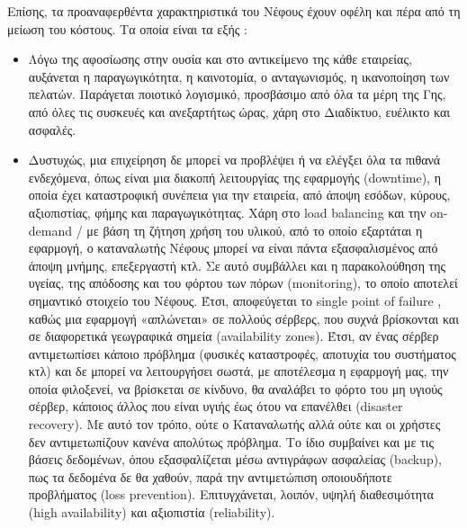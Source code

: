 \documentclass{article}
\begin{document}
Επίσης, τα προαναφερθέντα χαρακτηριστικά του Νέφους έχουν οφέλη και πέρα από τη μείωση του κόστους. Τα οποία είναι τα εξής :
\begin{itemize}
\item	Λόγω της αφοσίωσης στην ουσία και στο αντικείμενο της κάθε εταιρείας, αυξάνεται η παραγωγικότητα, η καινοτομία, ο ανταγωνισμός, η ικανοποίηση των πελατών. Παράγεται ποιοτικό λογισμικό, προσβάσιμο από όλα τα μέρη της Γης, από όλες τις συσκευές και ανεξαρτήτως ώρας, χάρη στο Διαδίκτυο, ευέλικτο και ασφαλές.

\item	Δυστυχώς, μια επιχείρηση δε μπορεί να προβλέψει ή να ελέγξει όλα τα πιθανά ενδεχόμενα, όπως είναι μια διακοπή λειτουργίας της εφαρμογής (downtime), η οποία έχει καταστροφική συνέπεια για την εταιρεία, από άποψη εσόδων, κύρους, αξιοπιστίας, φήμης και παραγωγικότητας. Χάρη στο load balancing και την on-demand / με βάση τη ζήτηση χρήση του υλικού, από το οποίο εξαρτάται η εφαρμογή, ο καταναλωτής Νέφους μπορεί να είναι πάντα εξασφαλισμένος από άποψη μνήμης, επεξεργαστή κτλ. Σε αυτό συμβάλλει και η παρακολούθηση της υγείας, της απόδοσης και του φόρτου των πόρων (monitoring), το οποίο αποτελεί σημαντικό στοιχείο του Νέφους. Έτσι, αποφεύγεται το single point of failure , καθώς μια εφαρμογή «απλώνεται» σε πολλούς σέρβερς, που συχνά βρίσκονται και σε διαφορετικά γεωγραφικά σημεία (availability zones). Έτσι, αν ένας σέρβερ αντιμετωπίσει κάποιο πρόβλημα (φυσικές καταστροφές, αποτυχία του συστήματος κτλ) και δε μπορεί να λειτουργήσει σωστά, με αποτέλεσμα η εφαρμογή μας, την οποία φιλοξενεί, να βρίσκεται σε κίνδυνο, θα αναλάβει το φόρτο του μη υγιούς σέρβερ, κάποιος άλλος που είναι υγιής έως ότου να επανέλθει (disaster recovery). Με αυτό τον τρόπο, ούτε ο Καταναλωτής αλλά ούτε και οι χρήστες δεν αντιμετωπίζουν κανένα απολύτως πρόβλημα. Το ίδιο συμβαίνει και με τις βάσεις δεδομένων, όπου εξασφαλίζεται μέσω αντιγράφων ασφαλείας (backup), πως τα δεδομένα δε θα χαθούν, παρά την αντιμετώπιση οποιουδήποτε προβλήματος (loss prevention). Επιτυγχάνεται, λοιπόν, υψηλή διαθεσιμότητα (high availability) και αξιοπιστία (reliability).


\end{itemize}
\end{document}
